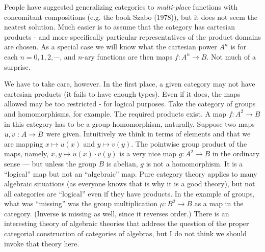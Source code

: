 People have suggested generalizing categories to {\it multi-place} functions with concomitant compositions (e.g. the book Szabo (1978)), but it does not seem the neatest solution. Much easier is to assume that the category has cartesian products - and more specifically particular representatives of the product
domains are chosen. As a special case we will know what the cartesian power $A^n$ is for each $n=0,1,2,\cdots$, and $n$-ary functions
are then maps $f: A^n\to B$. Not much of a surprise.

We have to take care, however. In the first place, a given category may not have cartesian products (it fails to have enough types). Even if it does, the maps allowed may be too restricted - for logical purposes. Take the category of groups and homomorphisms, for example. The required products exist.
A map $f : A^2 \to B$ in this category has to be a group homomorphism, naturally. Suppose two maps $u,v: A \rightarrow B$ were given.
Intuitively we think in terms of elements and that we are mapping $x \mapsto u(x)$ and $y \mapsto v(y)$. The pointwise group product of the maps, namely, $x,y \mapsto  u(x) \cdot v(y)$ is a very nice map $g : A^2 \to B$ in the ordinary sense --- but unless the group $B$ is abelian, $g$ is not a homomorphism. It is a ``logical'' map but not an ``algebraic'' map. Pure category theory applies to many algebraic situations (as everyone knows that is why it is a good theory), but not all categories are ``logical'' even if they have products. In the example of groups, what was ``missing'' was the group
multiplication $\mu: B^2 \to B$ as a map in the category. (Inverse is missing as well, since it reverses order.) There is an interesting theory of algebraic theories that address the question of the proper categorial construction of categories of algebras, but I do not think we should invoke that theory here.


